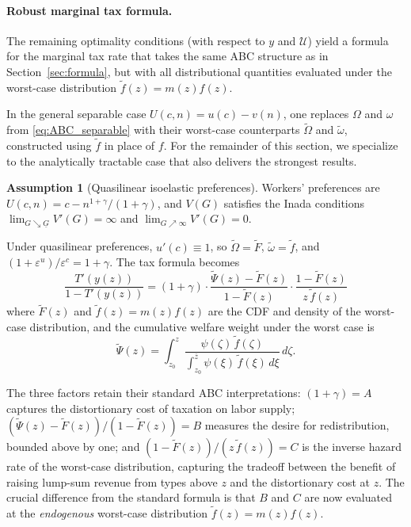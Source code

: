 \documentclass[12pt,a4paper]{article}
\theoremstyle{definition}
\newtheorem{assumption}{Assumption}[section]
\theoremstyle{plain}
\theoremstyle{remark}
\newcommand{\zbar}{\bar{z}}
\newcommand{\zlow}{z_{\scriptscriptstyle 0}}
\newcommand{\calU}{\mathcal{U}}
\begin{document}
\paragraph{Robust marginal tax formula.}
The remaining optimality conditions (with respect to $y$ and $\calU$) yield a formula for the marginal tax rate that takes the same ABC structure as in Section~\ref{sec:formula}, but with all distributional quantities evaluated under the worst-case distribution $\widetilde{f}(z) = m(z) f(z)$.

In the general separable case $U(c,n) = u(c) - v(n)$, one replaces $\Omega$ and $\omega$ from \eqref{eq:ABC_separable} with their worst-case counterparts $\widetilde{\Omega}$ and $\widetilde{\omega}$, constructed using $\widetilde{f}$ in place of $f$. For the remainder of this section, we specialize to the analytically tractable case that also delivers the strongest results.

\begin{assumption}[Quasilinear isoelastic preferences]
\label{as:robust_prefs}
Workers' preferences are $U(c,n) = c - n^{1+\gamma}/(1+\gamma)$, and $V(G)$ satisfies the Inada conditions $\lim_{G \searrow \underline{G}} V'(G) = \infty$ and $\lim_{G \nearrow \infty} V'(G) = 0$.
\end{assumption}

Under quasilinear preferences, $u'(c) \equiv 1$, so $\widetilde{\Omega} = \widetilde{F}$, $\widetilde{\omega} = \widetilde{f}$, and $(1+\varepsilon^u)/\varepsilon^c = 1 + \gamma$. The tax formula becomes
\begin{equation}
\label{eq:robust_tax_formula}
\boxed{
  \frac{T'(y(z))}{1 - T'(y(z))}
  = (1+\gamma) \cdot
    \frac{\widetilde{\Psi}(z) - \widetilde{F}(z)}{1 - \widetilde{F}(z)} \cdot
    \frac{1 - \widetilde{F}(z)}{z\, \widetilde{f}(z)}
}
\end{equation}
where $\widetilde{F}(z)$ and $\widetilde{f}(z) = m(z) f(z)$ are the CDF and density of the worst-case distribution, and the cumulative welfare weight under the worst case is
\[
  \widetilde{\Psi}(z) = \int_{\zlow}^{z} \frac{\psi(\zeta)\, \widetilde{f}(\zeta)}
    {\int_{\zlow}^{\zbar} \psi(\xi)\, \widetilde{f}(\xi)\, d\xi}\, d\zeta.
\]

The three factors retain their standard ABC interpretations: $(1+\gamma) = A$ captures the distortionary cost of taxation on labor supply; $(\widetilde{\Psi}(z) - \widetilde{F}(z))/(1 - \widetilde{F}(z)) = B$ measures the desire for redistribution, bounded above by one; and $(1 - \widetilde{F}(z))/(z\,\widetilde{f}(z)) = C$ is the inverse hazard rate of the worst-case distribution, capturing the tradeoff between the benefit of raising lump-sum revenue from types above $z$ and the distortionary cost at $z$. The crucial difference from the standard formula is that $B$ and $C$ are now evaluated at the \emph{endogenous} worst-case distribution $\widetilde{f}(z) = m(z) f(z)$.
\end{document}
